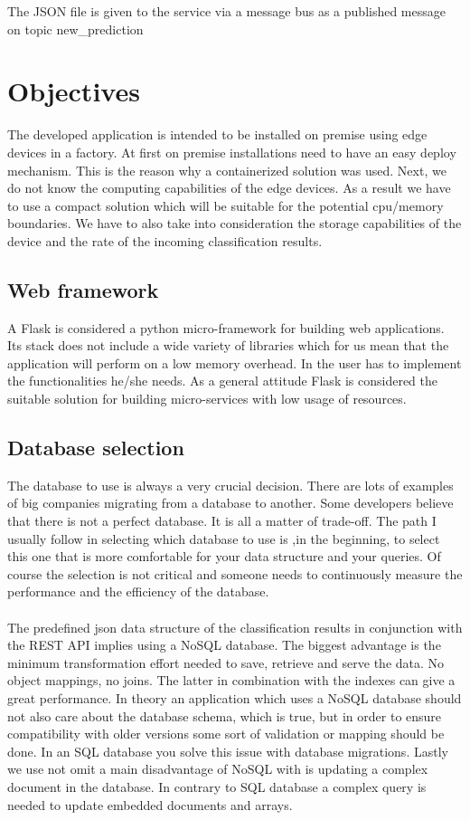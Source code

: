 \documentclass[a4paper,10pt]{article}
\begin{document}
The JSON file is given to the service via a message bus as a published message on
topic new\_prediction

\section{Objectives}
The developed application is intended to be installed on premise using edge devices
in a factory. At first on premise installations need to have an easy deploy mechanism. This
is the reason why a containerized solution was used. Next, we do not know the computing
capabilities of the edge devices. As a result we have to use a compact solution which
will be suitable for the potential cpu/memory boundaries. We have to also take into
consideration the storage capabilities of the device and the rate of the incoming
classification results.
\subsection{Web framework}
A Flask is considered a python micro-framework for building web applications. Its stack
does not include a wide variety of libraries which for us mean that the application will
perform on a low memory overhead. In the user has to implement the functionalities he/she needs.
As a general attitude Flask is considered the suitable solution for building micro-services with
low usage of resources.

\subsection{Database selection}
The database to use is always a very crucial decision. There are lots of examples of
big companies migrating from a database to another. Some developers believe that there
is not a perfect database. It is all a matter of trade-off. The path I usually follow
in selecting which database to use is ,in the beginning, to select this one that is more
comfortable for your data structure and your queries. Of course the selection is not
critical and someone needs to continuously measure the performance and the efficiency
of the database.\\
\\
The predefined json data structure of the classification results in conjunction with the REST API
implies using a NoSQL database. The biggest advantage is the minimum transformation effort
needed to save, retrieve and serve the data. No object mappings, no joins. The latter in
combination with the indexes can give a great performance. In theory an application which
uses a NoSQL database should not also care about the database schema, which is true, but
in order to ensure compatibility with older versions some sort of validation or mapping should be done.
In an SQL database you solve this issue with database migrations. Lastly we use not omit
a main disadvantage of NoSQL with is updating a complex document in the database. In contrary
to SQL database a complex query is needed to update embedded documents and arrays.
\end{document}
